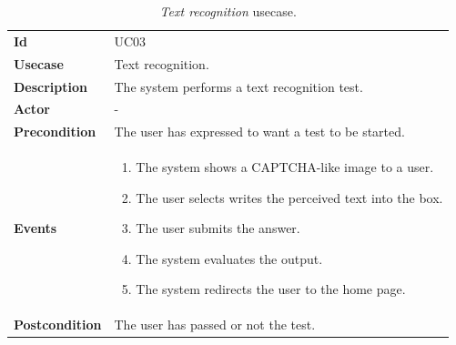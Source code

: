 \begin{table}[h!t]
    \centering
    \caption{\emph{Text recognition} usecase.}
    \label{tab:uc:text}
    \centering
    \begin{tabular}{l | p{80mm}}
        \textbf{Id}            & UC03                                                 \\
        \textbf{Usecase}       & Text recognition.                                    \\
        \textbf{Description}   & The system performs a text recognition test.         \\
        \textbf{Actor}         & -                                                    \\
        \textbf{Precondition}  & The user has expressed to want a test to be started. \\
        \textbf{Events}        & \begin{enumerate}
            \item The system shows a CAPTCHA-like image to a user.
            \item The user selects writes the perceived text into the box.
            \item The user submits the answer.
            \item The system evaluates the output.
            \item The system redirects the user to the home page.
        \end{enumerate}                           \\
        \textbf{Postcondition} & The user has passed or not the test.
    \end{tabular}
\end{table}

